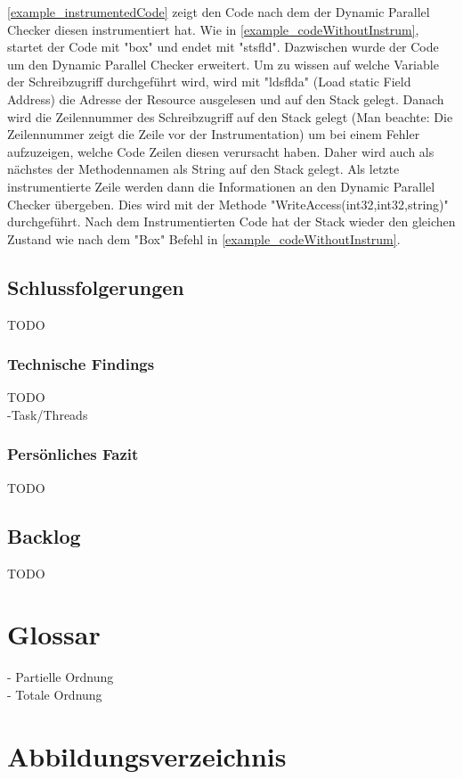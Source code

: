 \documentclass[10pt,a4paper]{article}
\begin{document}
\begin{flushleft}
\begin{figure}[H]
\end{figure}
\autoref{example_instrumentedCode} zeigt den Code nach dem der Dynamic Parallel Checker diesen instrumentiert hat. Wie in \autoref{example_codeWithoutInstrum}, startet der Code mit "box" und endet mit "stsfld". Dazwischen wurde der Code um den Dynamic Parallel Checker erweitert. Um zu wissen auf welche Variable der Schreibzugriff durchgeführt wird, wird mit "ldsflda" (Load static Field Address) die Adresse der Resource ausgelesen und auf den Stack gelegt. Danach wird die Zeilennummer des Schreibzugriff auf den Stack gelegt (Man beachte: Die Zeilennummer zeigt die Zeile vor der Instrumentation) um bei einem Fehler aufzuzeigen, welche Code Zeilen diesen verursacht haben. Daher wird auch als nächstes der Methodennamen als String auf den Stack gelegt. Als letzte instrumentierte Zeile werden dann die Informationen an den Dynamic Parallel Checker übergeben. Dies wird mit der Methode "WriteAccess(int32,int32,string)" durchgeführt. Nach dem Instrumentierten Code hat der Stack wieder den gleichen Zustand wie nach dem "Box" Befehl in \autoref{example_codeWithoutInstrum}.
\end{flushleft}
\subsection{Schlussfolgerungen}
TODO
\subsubsection{Technische Findings}
TODO\\
-Task/Threads
\subsubsection{Persönliches Fazit}
TODO
\subsection{Backlog}
TODO
\section{Glossar}
- Partielle Ordnung\\
- Totale Ordnung
\section{Abbildungsverzeichnis}
\listoffigures
\end{document}
